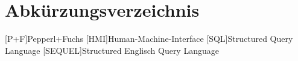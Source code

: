 
\chapter*{Abkürzungsverzeichnis}
\begin{acronym}[slmtA]
    [P+F]{Pepperl+Fuchs}
    [HMI]{Human-Machine-Interface }
    [SQL]{Structured Query Language}
    [SEQUEL]{Structured Englisch Query Language}
\end{acronym}
